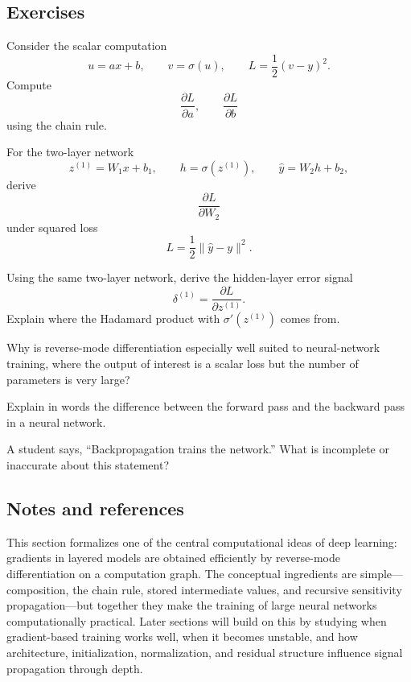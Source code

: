 \subsection*{Exercises}

\begin{exercise}
Consider the scalar computation
\[
u=ax+b,\qquad v=\sigma(u),\qquad L=\frac12(v-y)^2.
\]
Compute
\[
\frac{\partial L}{\partial a},
\qquad
\frac{\partial L}{\partial b}
\]
using the chain rule.
\end{exercise}

\begin{exercise}
For the two-layer network
\[
z^{(1)}=W_1x+b_1,\qquad h=\sigma(z^{(1)}),\qquad \hat y=W_2h+b_2,
\]
derive
\[
\frac{\partial L}{\partial W_2}
\]
under squared loss
\[
L=\frac12\|\hat y-y\|^2.
\]
\end{exercise}

\begin{exercise}
Using the same two-layer network, derive the hidden-layer error signal
\[
\delta^{(1)}=\frac{\partial L}{\partial z^{(1)}}.
\]
Explain where the Hadamard product with $\sigma'(z^{(1)})$ comes from.
\end{exercise}

\begin{exercise}
Why is reverse-mode differentiation especially well suited to neural-network training, where the output of interest is a scalar loss but the number of parameters is very large?
\end{exercise}

\begin{exercise}
Explain in words the difference between the forward pass and the backward pass in a neural network.
\end{exercise}

\begin{exercise}
A student says, ``Backpropagation trains the network.'' What is incomplete or inaccurate about this statement?
\end{exercise}

\subsection*{Notes and references}

This section formalizes one of the central computational ideas of deep learning: gradients in layered models are obtained efficiently by reverse-mode differentiation on a computation graph. The conceptual ingredients are simple---composition, the chain rule, stored intermediate values, and recursive sensitivity propagation---but together they make the training of large neural networks computationally practical. Later sections will build on this by studying when gradient-based training works well, when it becomes unstable, and how architecture, initialization, normalization, and residual structure influence signal propagation through depth.